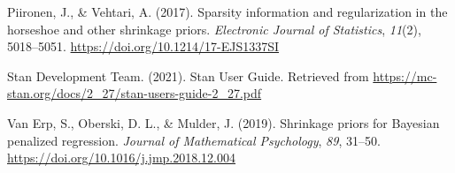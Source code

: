 \documentclass[
  english,
  man]{apa6}
\newlength{\cslhangindent}
\newlength{\cslentryspacingunit} %
\newenvironment{CSLReferences}[2] %
 {%
  \setlength{\parindent}{0pt}
  \ifodd #1
  \let\oldpar\par
  \def\par{\hangindent=\cslhangindent\oldpar}
  \fi
  \setlength{\parskip}{#2\cslentryspacingunit}
 }%
 {}
\begin{document}
\begin{CSLReferences}{1}{0}
\leavevmode{}%
Piironen, J., \& Vehtari, A. (2017). Sparsity information and regularization in the horseshoe and other shrinkage priors. \emph{Electronic Journal of Statistics}, \emph{11}(2), 5018--5051. \url{https://doi.org/10.1214/17-EJS1337SI}

\leavevmode{}%
Stan Development Team. (2021). Stan {User} {Guide}. Retrieved from \url{https://mc-stan.org/docs/2_27/stan-users-guide-2_27.pdf}

\leavevmode{}%
Van Erp, S., Oberski, D. L., \& Mulder, J. (2019). Shrinkage priors for {Bayesian} penalized regression. \emph{Journal of Mathematical Psychology}, \emph{89}, 31--50. \url{https://doi.org/10.1016/j.jmp.2018.12.004}

\end{CSLReferences}

\endgroup
\end{document}

